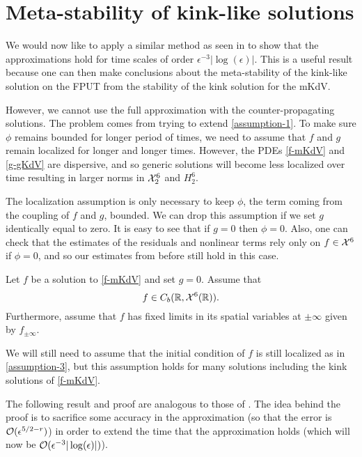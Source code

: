 \section{Meta-stability of kink-like solutions}

We would now like to apply a similar method as seen in \cite{khan2017long} to show that the approximations hold for time scales of order \(\epsilon^{-3}|\log(\epsilon)|\). This is a useful result because one can then make conclusions about the meta-stability of the kink-like solution on the FPUT from the stability of the kink solution for the mKdV. 

However, we cannot use the full approximation with the counter-propagating solutions. The problem comes from trying to extend \cref{assumption-1}. To make sure \(\phi\) remains bounded for longer period of times, we need to assume that \(f\) and \(g\) remain localized for longer and longer times. However, the PDEs \cref{f-mKdV} and \cref{g-gKdV} are dispersive, and so generic solutions will become less localized over time resulting in larger norms in \(\mathcal{X}^6_2\) and \(H^6_2\).

The localization assumption is only necessary to keep \(\phi\), the term coming from the coupling of \(f\) and \(g\), bounded. We can drop this assumption if we set \(g\) identically equal to zero. It is easy to see that if \(g=0\) then \(\phi = 0\). Also, one can check that the estimates of the residuals and nonlinear terms rely only on \(f \in \mathcal{X}^6\) if \(\phi = 0\), and so our estimates from before still hold in this case.

\begin{assum}\label{assumption-4}
	Let \(f\) be a solution to \cref{f-mKdV} and set \(g = 0\). Assume that 
	\begin{equation*}
		f \in C_b(\mathbb{R}, \mathcal{X}^6(\mathbb{R})).
	\end{equation*}
	Furthermore, assume that \(f\) has fixed limits in its spatial variables at \(\pm \infty\) given by \(f_{\pm \infty}\).
\end{assum}

We will still need to assume that the initial condition of \(f\) is still localized as in \cref{assumption-3}, but this assumption holds for many solutions including the kink solutions of \cref{f-mKdV}.

The following result and proof are analogous to those of \cite[Thm.~1]{khan2017long}. The idea behind the proof is to sacrifice some accuracy in the approximation (so that the error is \(\mathcal{O}(\epsilon^{5/2 - r})\)) in order to extend the time that the approximation holds (which will now be \(\mathcal{O}(\epsilon^{-3} |\log(\epsilon)|)\)).

